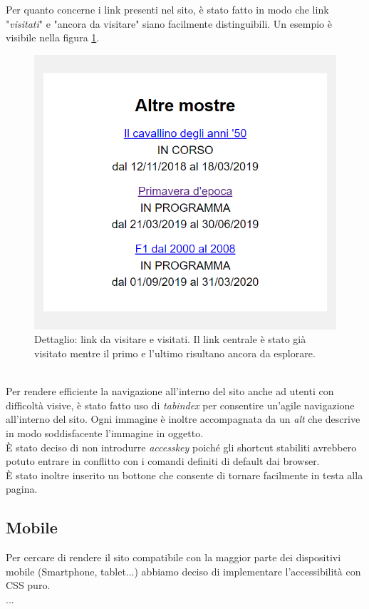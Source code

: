 Per quanto concerne i link presenti nel sito, è stato fatto in modo che link "\textit{visitati}" e "ancora da visitare" siano facilmente distinguibili. Un esempio è visibile nella figura \ref{fig:linkVisitatiDaVisitare}.
\begin{figure}[h]
	\begin{center}
		\includegraphics[scale=1.5]{Images/linkVisitatiDaVisitare.png}
		\caption{Dettaglio: link da visitare e visitati. Il link centrale è stato già visitato mentre il primo e l'ultimo risultano ancora da esplorare.}
		\label{fig:linkVisitatiDaVisitare}
	\end{center}
\end{figure}\\
Per rendere efficiente la navigazione all'interno del sito anche ad utenti con difficoltà visive, è stato fatto uso di \textit{tabindex} per consentire un'agile navigazione all'interno del sito. Ogni immagine è inoltre accompagnata da un \textit{alt} che descrive in modo soddisfacente l'immagine in oggetto.\\
È stato deciso di non introdurre \textit{accesskey} poiché gli shortcut stabiliti avrebbero potuto entrare in conflitto con i comandi definiti di default dai browser.\\
È stato inoltre inserito un bottone che consente di tornare facilmente in testa alla pagina.

\subsection{Mobile}
Per cercare di rendere il sito compatibile con la maggior parte dei dispositivi mobile (Smartphone, tablet...)
abbiamo deciso di implementare l'accessibilità con CSS puro.
\\ ...

